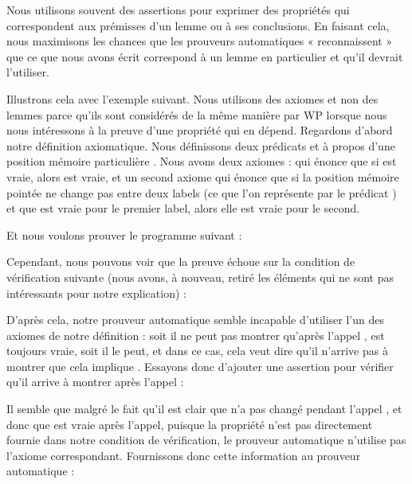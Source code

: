 

Nous utilisons souvent des assertions pour exprimer des propriétés qui
correspondent aux prémisses d'un lemme ou à ses conclusions. En faisant cela,
nous maximisons les chances que les prouveurs automatiques « reconnaissent »
que ce que nous avons écrit correspond à un lemme en particulier et qu'il
devrait l'utiliser.


Illustrons cela avec l'exemple suivant. Nous utilisons des axiomes et non des
lemmes parce qu'ils sont considérés de la même manière par WP lorsque nous nous
intéressons à la preuve d'une propriété qui en dépend. Regardons d'abord notre
définition axiomatique. Nous définissons deux prédicats  et
 à propos d'une position mémoire particulière .
Nous avons deux axiomes :  qui énonce que si 
est vraie, alors  est vraie, et un second axiome 
qui énonce que si la position mémoire pointée ne change pas entre deux labels
(ce que l'on représente par le prédicat ) et que 
est vraie pour le premier label, alors elle est vraie pour le second.





Et nous voulons prouver le programme suivant :




Cependant, nous pouvons voir que la preuve échoue sur la condition de vérification
suivante (nous avons, à nouveau, retiré les éléments qui ne sont pas intéressants
pour notre explication) :




D'après cela, notre prouveur automatique semble incapable d'utiliser l'un des
axiomes de notre définition : soit il ne peut pas montrer qu'après l'appel
,  est toujours vraie, soit il le peut, et
dans ce cas, cela veut dire qu'il n'arrive pas à montrer que cela implique
. Essayons donc d'ajouter une assertion pour vérifier qu'il
arrive à montrer  après l'appel :






Il semble que malgré le fait qu'il est clair que  n'a pas changé
pendant l'appel , et donc que 
est vraie après l'appel, puisque la propriété n'est pas directement fournie dans
notre condition de vérification, le prouveur automatique n'utilise pas l'axiome
 correspondant. Fournissons donc cette information au prouveur
automatique :


